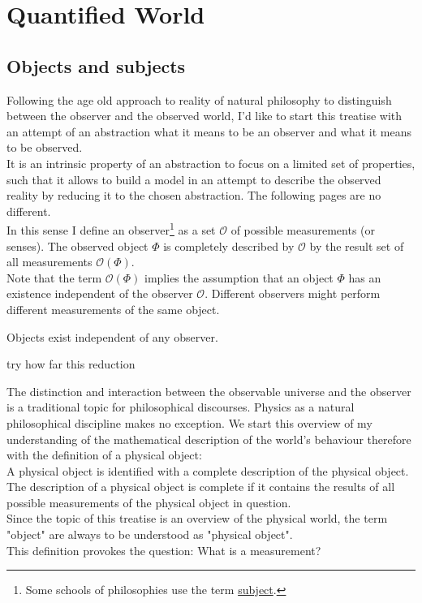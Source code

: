 \section{Quantified World}
\subsection{Objects and subjects}
Following the age old approach to reality of natural philosophy to distinguish between the observer and the observed world, I'd like to start this treatise with an attempt of an abstraction what it means to be an observer and what it means to be observed.\\
It is an intrinsic property of an abstraction to focus on a limited set of properties, such that it allows to build a model in an attempt to describe the observed reality by reducing it to the chosen abstraction. The following pages are no different.\\
In this sense I define an observer\footnote{Some schools of philosophies use the term \href{https://en.wikipedia.org/wiki/Subject_(philosophy)}{subject}.} as a set $\mathcal{O}$ of possible measurements (or senses). The observed object $\Phi$ is completely described by $\mathcal{O}$ by the result set of all measurements $\mathcal{O}(\Phi)$.\\
Note that the term $\mathcal{O}(\Phi)$ implies the assumption that an object $\Phi$ has an existence independent  of the observer $\mathcal{O}$. Different observers might perform different measurements  of the same object.
\begin{axiom}
Objects exist independent of any observer.
\end{axiom}
 try how far this reduction 

The distinction and interaction between the observable universe and the observer is a traditional topic for philosophical discourses. Physics as a natural philosophical discipline makes no exception. We start this overview of my understanding of the mathematical description of the world's behaviour therefore with the definition of a physical object:\\
A physical object is identified with a complete description of the physical object.
The description of a physical object is complete if it contains the results of all possible measurements of the physical object in question.\\
Since the topic of this treatise is an overview of the physical world, the term "object" are always to be understood as "physical object".\\
This definition provokes the question: What is a measurement?
 

